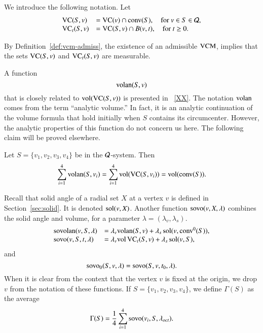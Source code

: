 \begin{definition}  We introduce the following notation.  Let
    $$
    \begin{array}{lll}
        {\operatorname{VC}}(S,v) &= {\operatorname{VC}}(v)\cap {\operatorname{conv}}(S),\quad \text{for } v\in
        S\in{\mathcal Q},\\
        {\operatorname{VC}}_t(S,v) &= {\operatorname{VC}}(S,v)\cap B(v,t),\quad\text{for } t\ge
        0.
    \end{array}
    $$
\end{definition}

By Definition~\ref{def:vcm-admiss}, the existence of an admissible
${\operatorname{VCM}}$, implies that the sets ${\operatorname{VC}}(S,v)$ and
${\operatorname{VC}}_t(S,v)$ are measurable.

A function
    $$
    {\operatorname{volan}}(S,v)
    $$ that is closely related to ${\operatorname{vol}}({\operatorname{VC}}(S,v))$ is presented in
\Chap~\ref{XX}.  The notation ${\operatorname{volan}}$
comes from the term ``analytic volume.''  In fact, it is an
analytic continuation of the volume formula that hold initially
when $S$ contains its circumcenter.  However, the analytic
properties of this function do not concern us here.  The following
claim will be proved elsewhere.

\begin{claim}\label{claim:volan} Let $S=\{v_1,v_2,v_3,v_4\}$ be in
the ${\mathcal Q}$-system. Then
    $$
    \sum_{i=1}^4 {\operatorname{volan}}(S,v_i) = \sum_{i=1}^4
    {\operatorname{vol}}({\operatorname{VC}}(S,v_i)) = {\operatorname{vol}}({\operatorname{conv}}(S)).
    $$
\end{claim}



\begin{definition}\label{def:svor}
Recall that solid angle of a radial set $X$ at a vertex $v$ is defined in
Section~\ref{sec:solid}.  It is denoted $\operatorname{sol}(v,X)$.
Another function ${\operatorname{sovo}}(v,X,\lambda)$ combines the solid
angle and volume, for a parameter $\lambda=(\lambda_v,\lambda_s)$.
%
      $$
      \begin{array}{lll}
      {\operatorname{sovolan}}(v,S,\lambda) &= \lambda_v {\operatorname{volan}}(S,v)
         +\lambda_s\operatorname{sol}(v,{\operatorname{conv}}^0(S)),\\
      {\operatorname{sovo}}(v,S,t,\lambda) &= \lambda_v {\operatorname{vol}}\,{\operatorname{VC}}_{t}(S,v)
         +\lambda_s\operatorname{sol}(v,S),
      \end{array}$$
   and
      $$
      {\operatorname{sovo}}_0(S,v,\lambda) = {\operatorname{sovo}}(S,v,t_0,\lambda).
      $$
   When it is clear from the context that the vertex $v$ is
   fixed at the origin, we drop $v$ from the notation of these
   functions.
   If $S=\{v_1,v_2,v_3,v_4\}$, we define $\Gamma(S)$ as the average
   \begin{equation}
   \Gamma(S) = \frac{1}{4}\sum_{i=1}^4{\operatorname{sovo}}(v_i,S,\lambda_{oct}).
   \label{eqn:gamma}
   \end{equation}
%
\end{definition}

